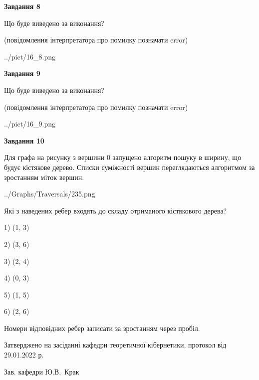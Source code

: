 \documentclass[12pt, ukrainian]{article}
\begin{document}
{\begin {large}
{\begin {center}\textbf{Завдання 8}\end {center}}\par
Що буде виведено за виконання?\par
 (повідомлення інтерпретатора про помилку позначати error)\par
\begin{center}
	{../pict/16_8.png}
\end{center}
\newpage

{\begin {center}\textbf{Завдання 9}\end {center}}\par
Що буде виведено за виконання?\par
 (повідомлення інтерпретатора про помилку позначати error)\par
\begin{center}
	{../pict/16_9.png}
\end{center}
\newpage

{\begin {center}\textbf{Завдання 10}\end {center}}\par
Для графа на рисунку з вершини 0 запущено алгоритм пошуку в ширину, що будує кістякове дерево. Списки суміжності вершин переглядаються алгоритмом за зростанням міток вершин.\par
\begin{center}
	{../Graphs/Traversals/235.png}
\end{center}
\par Які з наведених ребер входять до складу отриманого кістякового дерева?\par
1) (1, 3)\par
2) (3, 6)\par
3) (2, 4)\par
4) (0, 3)\par
5) (1, 5)\par
6) (2, 6)\par
{\vskip 15pt} Номери відповідних ребер записати за зростанням через пробіл.\par
\newpage


\end {large}
}
{\smallskip \begin {small} Затверджено на засіданні кафедри теоретичної кібернетики, протокол  від   29.01.2022 р.\par\smallskip\smallskip
{\parbox {6.5 cm}{Зав. кафедри \dotfill Ю.В.~Крак}} \end{small}}
\end{document}
